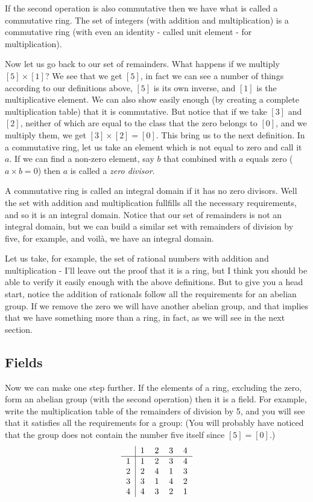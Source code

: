 If the second operation is also commutative then we have what is called
a commutative ring. The set of integers (with addition and
multiplication)
is a commutative ring (with even an identity - called unit element -
for 
multiplication).

Now let us go back to our set of remainders. What happens if we
multiply
$[5] \times [1]$? We see that we get $[5]$, in fact we can see a number
of things according to our definitions above, $[5]$ is its own inverse,
and
$[1]$ is the multiplicative element. We can also show easily enough (by
creating a complete multiplication table) that it is commutative. But
notice 
that if we take $[3]$ and $[2]$, neither of which are equal to the
class
that the zero belongs to $[0]$, and we multiply them, we get $[3]
\times
[2] = [0]$.  This bring us to the next definition. In a commutative
ring,
let us take an element which is not equal to zero and call 
it  $a$. If we can find a non-zero element, say $b$ that combined with
$a$ equals zero ( $a \times b = 0$) then $a$ is called a {\it zero
divisor}.

A commutative ring is called an integral domain if it has no zero
divisors.
Well the set \Z{} with addition and multiplication fullfills all the
necessary
requirements, and so it is an integral domain. Notice that our set of
remainders is not an integral domain, but we can build a similar set
with
remainders of division by five, for example, and voil\`a, we have an
integral
domain.

Let us take, for example, the set \Q{} of
rational numbers with addition and multiplication - I'll leave out the 
proof that it is a ring, but I think you should be able to verify it
easily
enough with the above definitions. But to give you a head start, 
notice the addition of rationals follow all the requirements for an
abelian group. If we remove the zero we will have another abelian
group,
and that implies that we have something more than a ring, in fact, as
we will see in the next section.

\subsection{Fields}


Now we can make one step further. If the elements of a ring, excluding
the
zero, form an abelian group (with the second operation) then it is a
field.
For example, write the multiplication table of the remainders of
division 
by 5, and you will see that it satisfies all the requirements for a
group:
(You will probably have noticed that the group does not contain the
number 
five itself since $[5] = [0]$.)
\[
\begin{tabular}{  c  |  c  c  c  c  }
 & 1 & 2 & 3 & 4  \\
\hline
1 & 1 & 2 & 3 & 4 \\ 
2 & 2 & 4 & 1 & 3 \\
3 & 3 & 1 & 4 & 2 \\
4 & 4 & 3 & 2 & 1
\end{tabular}
\]

